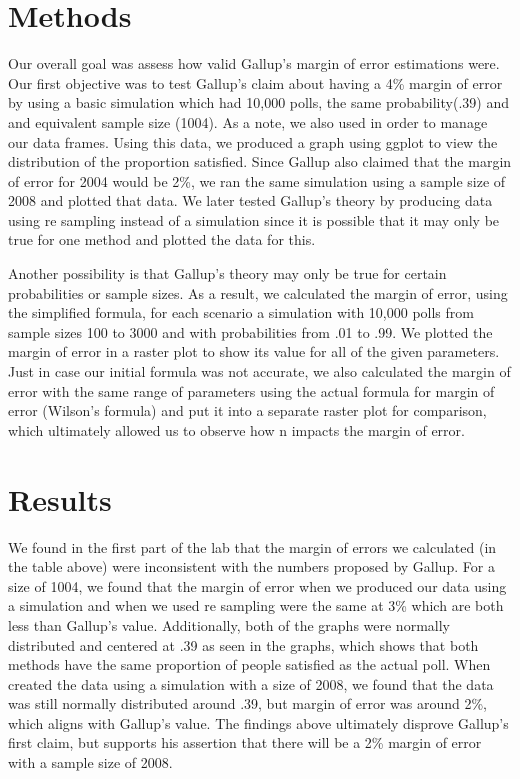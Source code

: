 \documentclass{article}\usepackage[]{graphicx}\usepackage[]{xcolor}
\begin{document}
\begin{multicols}{2}
\section{Methods}
Our overall goal was assess how valid Gallup's margin of error estimations were. Our first objective was to test Gallup's claim about having a 4\% margin of error by using a basic simulation which had 10,000 polls, the same probability(.39) and and equivalent sample size (1004). As a note, we also used \citep{tidyverse} in order to manage our data frames. Using this data, we produced a graph using ggplot \citep{ggplot2} to view the distribution of the proportion satisfied. Since Gallup also claimed that the margin of error for 2004 would be 2\%, we ran the same simulation using a sample size of 2008 and plotted that data. We later tested Gallup's theory by producing data using re sampling instead of a simulation since it is possible that it may only be true for one method and plotted the data for this. 

Another possibility is that Gallup's theory may only be true for certain probabilities or sample sizes. As a result, we calculated the margin of error, using the simplified formula, for each scenario a simulation with 10,000 polls from sample sizes 100 to 3000 and with probabilities from .01 to .99. We plotted the margin of error in a raster plot to show its value for all of the given parameters. Just in case our initial formula was not accurate,  we also calculated the margin of error with the same range of parameters using the actual formula for margin of error (Wilson's formula) and put it into a separate raster plot for comparison, which ultimately allowed us to observe how n impacts the margin of error. 

\section{Results}
We found in the first part of the lab that the margin of errors we calculated (in the table above) were inconsistent with the numbers proposed by Gallup. For a size of 1004, we found that the margin of error when we produced our data using a simulation and when we used re sampling were the same at 3\% which are both less than Gallup's value. Additionally, both of the graphs were normally distributed and centered at .39 as seen in the graphs, which shows that both methods have the same proportion of people satisfied as the actual poll. When created the data using a simulation with a size of 2008, we found that the data was still normally distributed around .39, but margin of error was around 2\%, which aligns with Gallup's value. The findings above ultimately disprove Gallup's first claim, but supports his assertion that there will be a 2\% margin of error with a sample size of 2008. 


\end{multicols}
\end{document}
